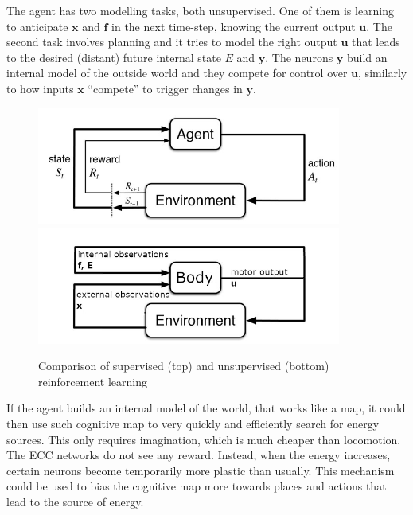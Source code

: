 \documentclass[12pt]{article}
\begin{document}
The agent has two modelling tasks, both unsupervised. One of them is learning to anticipate $\boldsymbol{x}$ and $\boldsymbol{f}$ in the next time-step, knowing the current output $\boldsymbol{u}$. The second task involves planning and it tries to model the right output $\boldsymbol{u}$ that leads to the desired (distant) future internal state $E$ and $\boldsymbol{y}$. The neurons $\boldsymbol{y}$ build an internal model of the outside world and they compete for control over $\boldsymbol{u}$, similarly to how inputs $\boldsymbol{x}$ ``compete'' to trigger changes in $\boldsymbol{y}$.

\begin{figure}[!htbp]
	\centering
	\includegraphics[width=10cm]{supervised reinforcement learning}
	\includegraphics[width=10cm]{unsupervised reinforcement learning}
	\caption{Comparison of supervised (top) and unsupervised (bottom) reinforcement learning}
	\label{fig:rl}
\end{figure} 

If the agent builds an internal model of the world, that works like a map, it could then use such cognitive map to very quickly and efficiently search for energy sources. This only requires imagination, which is much cheaper than locomotion. The ECC networks do not see any reward. Instead, when the energy increases, certain neurons become temporarily more plastic than usually. This mechanism could be used to bias the cognitive map more towards places and actions that lead to the source of energy.
\end{document}
